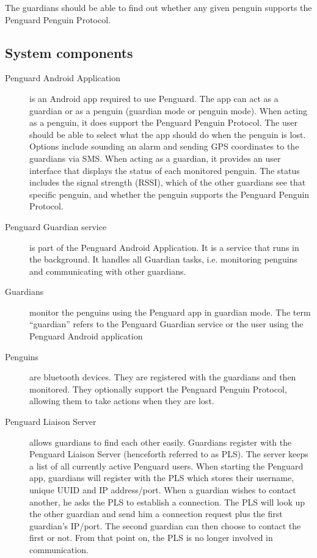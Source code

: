\documentclass{report}
\begin{document}
The guardians should be able to find out whether any given penguin supports the Penguard Penguin Protocol.

\subsection{System components}

\begin{description}
    \item [Penguard Android Application] is an Android app required to use Penguard. The app can act as a guardian or as a penguin (guardian mode or penguin mode). When acting as a penguin, it does support the Penguard Penguin Protocol. The user should be able to select what the app should do when the penguin is lost. Options include sounding an alarm and sending GPS coordinates to the guardians via SMS. When acting as a guardian, it provides an user interface that displays the status of each monitored penguin. The status includes the signal strength (RSSI), which of the other guardians see that specific penguin, and whether the penguin supports the Penguard Penguin Protocol.
    \item [Penguard Guardian service] is part of the Penguard Android Application. It is a service that runs in the background. It handles all Guardian tasks, i.e. monitoring penguins and communicating with other guardians.
    \item [Guardians] monitor the penguins using the Penguard app in guardian mode. The term ``guardian'' refers to the Penguard Guardian service or the user using the Penguard Android application
    \item [Penguins] are bluetooth devices. They are registered with the guardians and then monitored. They optionally support the Penguard Penguin Protocol, allowing them to take actions when they are lost.
    \item [Penguard Liaison Server] allows guardians to find each other easily. Guardians register with the Penguard Liaison Server (henceforth referred to as PLS). The server keeps a list of all currently active Penguard users. When starting the Penguard app, guardians will register with the PLS which stores their username, unique UUID and IP address/port. When a guardian wishes to contact another, he asks the PLS to establish a connection. The PLS will look up the other guardian and send him a connection request plus the first guardian's IP/port. The second guardian can then choose to contact the first or not. From that point on, the PLS is no longer involved in communication.
\end{description}
\end{document}

